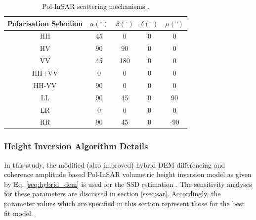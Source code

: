\documentclass[12pt]{elsarticle}
\numberwithin{equation}{section}
\numberwithin{figure}{section}
\numberwithin{table}{section}
\begin{document}
\begin{table}[ht]
\centering
\caption{Pol-InSAR scattering mechanisms \citep{Cloude2005}.}
\label{table:1}
\begin{tabular}{c c c c c}
\hline
\textbf{Polarisation Selection} & \boldmath$\alpha(^\circ)$   & \boldmath$\beta(^\circ)$     & \boldmath$\delta(^\circ)$ & \boldmath$\mu(^\circ)$       \\ \hline
HH                     & 45 & 0   & 0          & 0   \\ 
HV                     & 90 & 90  & 0          & 0   \\ 
VV                     & 45 & 180 & 0          & 0   \\ 
HH+VV                  & 0  & 0   & 0          & 0   \\ 
HH-VV                  & 90 & 0   & 0          & 0   \\ 
LL                     & 90 & 45  & 0          & 90  \\ 
LR                     & 0  & 0   & 0           & 0   \\ 
RR                     & 90 & 45  & 0          & -90 \\ \hline
\end{tabular}
\end{table}

\subsubsection{Height Inversion Algorithm Details}
In this study, the modified (also improved) hybrid DEM differencing and coherence amplitude based Pol-InSAR volumetric height inversion model as given by Eq. \eqref{seq:hybrid_dem} is used for the SSD estimation \citep{Majumdar2019a}. The sensitivity analyses for these parameters are discussed in section \ref{ssec:sar}. Accordingly, the parameter values which are specified in this section represent those for the best fit model. 
\end{document}
